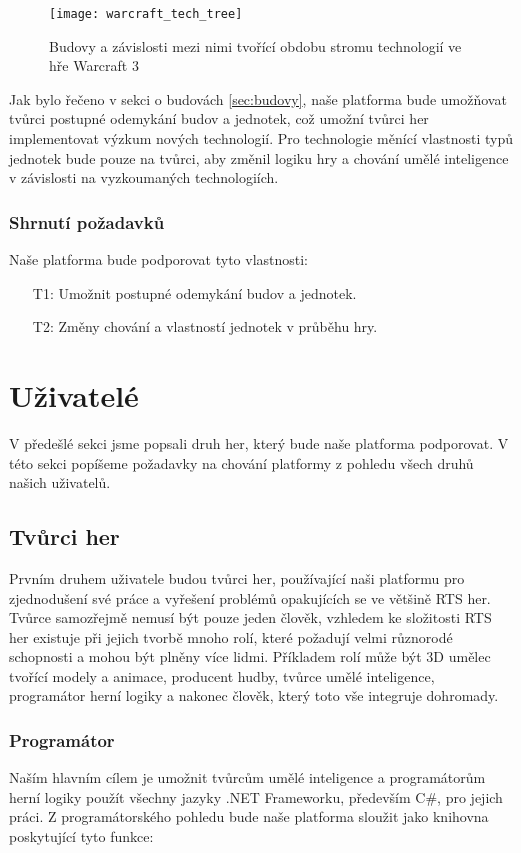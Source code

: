 \begin{figure}[h]	
	\centering
	\texttt{[image: warcraft\_tech\_tree]}
	\caption{Budovy a závislosti mezi nimi tvořící obdobu stromu technologií ve hře Warcraft 3}
	\label{fig:warcrafttechtree}
\end{figure}

Jak bylo řečeno v sekci o budovách \ref{sec:budovy}, naše platforma bude umožňovat tvůrci postupné odemykání budov a jednotek, což umožní tvůrci her implementovat výzkum nových technologií. Pro technologie měnící vlastnosti typů jednotek bude pouze na tvůrci, aby změnil logiku hry a chování umělé inteligence v závislosti na vyzkoumaných technologiích.

\subsubsection{Shrnutí požadavků}

Naše platforma bude podporovat tyto vlastnosti:
\begin{itemize}
	\item[T1:] Umožnit postupné odemykání budov a jednotek.
	\item[T2:] Změny chování a vlastností jednotek v průběhu hry.
\end{itemize}

\section{Uživatelé}
V předešlé sekci jsme popsali druh her, který bude naše platforma podporovat. V této sekci popíšeme požadavky na chování platformy z pohledu všech druhů našich uživatelů.

\subsection{Tvůrci her}
Prvním druhem uživatele budou tvůrci her, používající naši platformu pro zjednodušení své práce a vyřešení problémů opakujících se ve většině RTS her. Tvůrce samozřejmě nemusí být pouze jeden člověk, vzhledem ke složitosti RTS her existuje při jejich tvorbě mnoho rolí, které požadují velmi různorodé schopnosti a mohou být plněny více lidmi. Příkladem rolí může být 3D umělec tvořící modely a animace, producent hudby, tvůrce umělé inteligence, programátor herní logiky a nakonec člověk, který toto vše integruje dohromady.

\subsubsection{Programátor}
Naším hlavním cílem je umožnit tvůrcům umělé inteligence a programátorům herní logiky použít všechny jazyky .NET Frameworku, především C\#, pro jejich práci. Z programátorského pohledu bude naše platforma sloužit jako knihovna poskytující tyto funkce:

